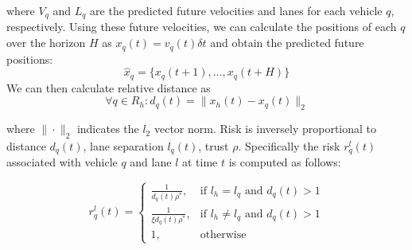\documentclass[letterpaper, 10 pt, conference]{ieeeconf}  %
\newcommand\NB[1]{$\spadesuit$\footnote{NB: #1}}
\newcommand\RP[1]{$\clubsuit$\footnote{RP: #1}}
\begin{document}

where $V_q$ and $L_q$ are the predicted future velocities and lanes for each vehicle $q$, respectively.
Using these future velocities, we can calculate the positions of each $q$ over the horizon $H$ as $x_q(t) = v_q(t)\delta t$ and obtain the predicted future positions:
\begin{equation}
    \hat{x}_q = \{x_q(t+1),\ldots,x_q(t+H)\}
\end{equation}
We can then calculate relative distance as
\begin{equation}
    \forall q \in R_h: d_q(t) = \lVert x_h(t)-x_q(t)\rVert_2
\end{equation}




where $\rVert \cdot \lVert_2$ indicates the $l_2$ vector norm. Risk is inversely proportional to distance $d_q(t)$, lane separation $l_q(t)$, trust $\rho$. Specifically the risk $r_q^l(t)$ associated with vehicle $q$ and lane $l$ at time $t$ is computed as follows: %

\begin{equation} \label{eq:riskcalc}
    r_{q}^{l}(t) =
    \begin{cases}
    \frac{1}{d_{q}(t)\rho^*},  & \text{if } l_h=l_q \text{ and } d_{q}(t) > 1  \\
    \frac{1}{\xi d_{q}(t)\rho^*},  & \text{if } l_h\neq l_q \text{ and } d_{q}(t) > 1  \\
        1,                     & \text{otherwise}  
    \end{cases}
\end{equation}
\end{document}
